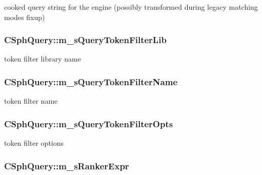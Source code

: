 cooked query string for the engine (possibly transformed during legacy matching modes fixup) 

\hypertarget{classCSphQuery_a18df87b6e5709334636cdf6ecf987a6e}{
\subsubsection[{m\-\_\-s\-Query\-Token\-Filter\-Lib}]{ C\-Sph\-Query\-::m\-\_\-s\-Query\-Token\-Filter\-Lib}}\label{classCSphQuery_a18df87b6e5709334636cdf6ecf987a6e}


token filter library name 

\hypertarget{classCSphQuery_a5ed04255f875d4b81fae92b06be57114}{
\subsubsection[{m\-\_\-s\-Query\-Token\-Filter\-Name}]{ C\-Sph\-Query\-::m\-\_\-s\-Query\-Token\-Filter\-Name}}\label{classCSphQuery_a5ed04255f875d4b81fae92b06be57114}


token filter name 

\hypertarget{classCSphQuery_afac78b8292278a669085040550823aeb}{
\subsubsection[{m\-\_\-s\-Query\-Token\-Filter\-Opts}]{ C\-Sph\-Query\-::m\-\_\-s\-Query\-Token\-Filter\-Opts}}\label{classCSphQuery_afac78b8292278a669085040550823aeb}


token filter options 

\hypertarget{classCSphQuery_adafccf145800d5cd305aa38023ba22e5}{
\subsubsection[{m\-\_\-s\-Ranker\-Expr}]{ C\-Sph\-Query\-::m\-\_\-s\-Ranker\-Expr}}\label{classCSphQuery_adafccf145800d5cd305aa38023ba22e5}


